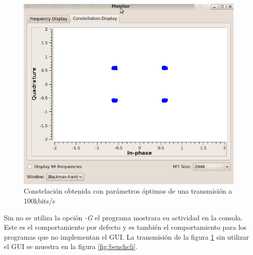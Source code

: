 \begin{figure}[htp]
  \centering
  \includegraphics[width=5.5in]{figs/firstgoodconst}
  \vspace{0.3in}
  \caption{Constelaci\'on obtenida con par\'ametros \'optimos de una transmisi\'on a 100kbits/s}
  \label{fig:firstgoodconst}
\end{figure}

Sin no se utiliza la opci\'on \emph{-G} el programa mostrara su actividad en la consola. Este es el
comportamiento por defecto y es tambi\'en el comportamiento para los programas que no implementan el
GUI. La transmisi\'on de la figura \ref{fig:firstgoodconst} sin utilizar el GUI se muestra en la
figura \ref{fig:benchcli}.

